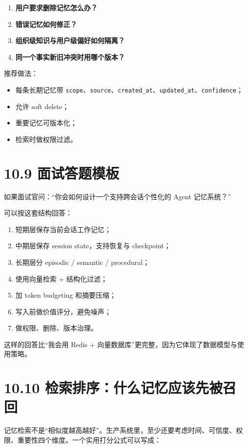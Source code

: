 \begin{enumerate}[leftmargin=2em]
\item \textbf{用户要求删除记忆怎么办？}
\item \textbf{错误记忆如何修正？}
\item \textbf{组织级知识与用户级偏好如何隔离？}
\item \textbf{同一个事实新旧冲突时用哪个版本？}
\end{enumerate}

推荐做法：


\begin{itemize}[leftmargin=2em]
\item 每条长期记忆带 \texttt{scope}、\texttt{source}、\texttt{created\_at}、\texttt{updated\_at}、\texttt{confidence}；
\item 允许 soft delete；
\item 重要记忆可版本化；
\item 检索时做权限过滤。
\end{itemize}

\section{10.9 面试答题模板}

如果面试官问：``你会如何设计一个支持跨会话个性化的 Agent 记忆系统？''


可以按这套结构回答：


\begin{enumerate}[leftmargin=2em]
\item 短期层保存当前会话工作记忆；
\item 中期层保存 session state，支持恢复与 checkpoint；
\item 长期层分 episodic / semantic / procedural；
\item 使用向量检索 + 结构化过滤；
\item 加 token budgeting 和摘要压缩；
\item 写入前做价值评分，避免噪声；
\item 做权限、删除、版本治理。
\end{enumerate}

这样的回答比``我会用 Redis + 向量数据库''更完整，因为它体现了数据模型与使用策略。


\section{10.10 检索排序：什么记忆应该先被召回}

记忆检索不是``相似度越高越好''。生产系统里，至少还要考虑时间、可信度、权限、重要性四个维度。一个实用打分公式可以写成：


